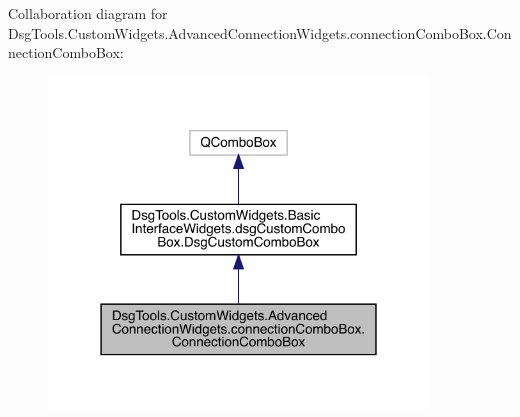 Collaboration diagram for Dsg\+Tools.\+Custom\+Widgets.\+Advanced\+Connection\+Widgets.\+connection\+Combo\+Box.\+Connection\+Combo\+Box\+:
\nopagebreak
\begin{figure}[H]
\begin{center}
\leavevmode
\includegraphics[width=286pt]{class_dsg_tools_1_1_custom_widgets_1_1_advanced_connection_widgets_1_1connection_combo_box_1_1_cd8cf4fbd94d05361c33409de14c4bb55}
\end{center}
\end{figure}

